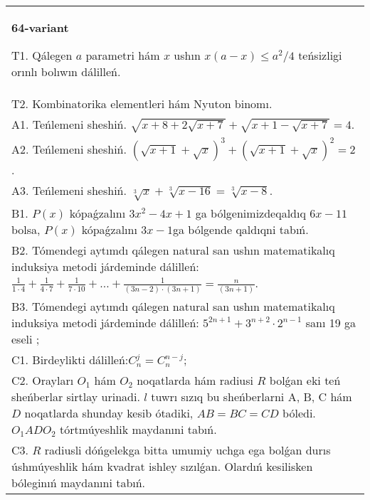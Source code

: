 \documentclass{article}
\begin{document}
\begin{tabular}{m{17cm}}
\textbf{64-variant}
\newline

T1. Qálegen \(a\) parametri hám \(x\) ushın \(x(a - x) \leq a^{2}/4\) teńsizligi orınlı bolıwın dálilleń. \\
T2. Kombinatorika elementleri hám Nyuton binomı. \\
A1. Teńlemeni sheshiń. \(\sqrt{x + 8 + 2\sqrt{x + 7}} + \sqrt{x + 1 - \sqrt{x + 7}} = 4\). \\
A2. Teńlemeni sheshiń. \((\sqrt{x + 1} + \sqrt{x})^{3} + (\sqrt{x + 1} + \sqrt{x})^{2} = 2\). \\
A3. Teńlemeni sheshiń. \(\sqrt[3]{x} + \sqrt[3]{x - 16} = \sqrt[3]{x - 8}\). \\
B1. \(P(x)\) kópaǵzalını \(3x^{2} - 4x + 1\) ga bólgenimizdeqaldıq \(6x - 11\) bolsa, \(P(x)\) kópaǵzalını \(3x - 1\)ga bólgende qaldıqni tabıń. \\
B2. Tómendegi aytımdı qálegen natural san ushın matematikalıq induksiya metodi járdeminde dálilleń: \(\frac{1}{1 \cdot 4} + \frac{1}{4 \cdot 7} + \frac{1}{7 \cdot 10} + \ldots + \frac{1}{(3n - 2) \cdot (3n + 1)} = \frac{n}{(3n + 1)}\). \\
B3. Tómendegi aytımdı qálegen natural san ushın matematikalıq induksiya metodi járdeminde dálilleń: \(5^{2n + 1} + 3^{n + 2} \cdot 2^{n - 1}\) sanı 19 ga eseli ; \\
C1. Birdeylikti dálilleń:\(C_{n}^{j} = C_{n}^{n - j}\); \\
C2. Orayları \(O_{1}\) hám \(O_{2}\) noqatlarda hám radiusi \(R\) bolǵan eki teń sheńberlar sirtlay urinadi. \(l\) tuwrı sızıq bu sheńberlarni A, B, C hám \(D\) noqatlarda shunday kesib ótadiki, \(AB = BC = CD\) bóledi. \(O_{1}ADO_{2}\) tórtmúyeshlik maydanıni tabıń. \\
C3. \(R\) radiusli dóńgelekga bitta umumiy uchga ega bolǵan durıs úshmúyeshlik hám kvadrat ishley sızılǵan. Olardıń kesilisken bóleginıń maydanıni tabıń. \\

\end{tabular}
\vspace{1cm}
\end{document}
